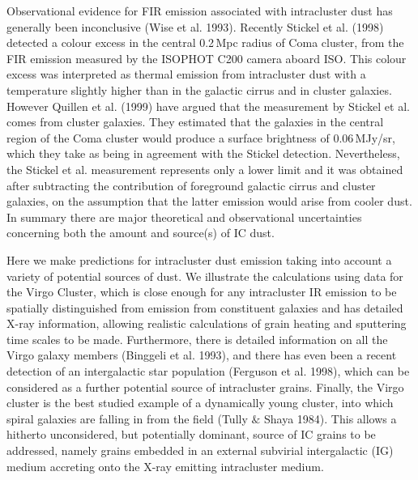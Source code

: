 \documentclass[]{aa}
\begin{document}
Observational evidence for FIR emission associated with intracluster dust 
has generally been inconclusive (Wise 
et al. 1993). Recently Stickel et al. (1998) detected a colour excess in 
the central 0.2\,Mpc radius of Coma cluster, from the FIR emission measured 
by the ISOPHOT C200 camera aboard ISO. This colour excess was interpreted as 
thermal emission from intracluster dust with a temperature slightly higher 
than in the galactic cirrus and in cluster galaxies. However
Quillen et al. (1999) have argued that the measurement by Stickel et al. 
comes from cluster galaxies. They estimated that the galaxies in the central 
region of the Coma cluster would produce a surface brightness of 
0.06\,MJy/sr, which they take as being in agreement with the Stickel 
detection. Nevertheless, the Stickel et al.
measurement represents only a lower limit and it was obtained after 
subtracting the contribution of foreground galactic cirrus and cluster 
galaxies, on the assumption that the latter emission would arise from cooler 
dust. In summary there are major theoretical and observational uncertainties
concerning both the amount and source(s) of IC dust.

Here we make predictions for intracluster dust emission taking into
account a variety of potential sources of dust. We illustrate the calculations
using data for the Virgo Cluster, which is close enough for any intracluster
IR emission to be spatially distinguished from emission from constituent 
galaxies and has detailed X-ray information, allowing realistic calculations 
of grain heating and sputtering time scales to be made. Furthermore, there is 
detailed information on all the Virgo galaxy members (Binggeli et al. 1993), 
and there has even been a recent detection of an intergalactic
star population (Ferguson et al. 1998), which can be considered as a further
potential source of intracluster grains. Finally, the Virgo cluster is the 
best studied example of a dynamically young cluster, into which
spiral galaxies are falling in from the field (Tully $\&$ Shaya 1984). This
allows a hitherto unconsidered, but potentially dominant, source of IC grains
to be addressed, namely grains embedded in an external subvirial 
intergalactic (IG) medium accreting onto the X-ray emitting 
intracluster medium.
\end{document}
